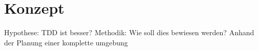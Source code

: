 \section{Konzept}
Hypothese: TDD ist besser?
Methodik: Wie soll dies bewiesen werden? Anhand der Planung einer komplette umgebung